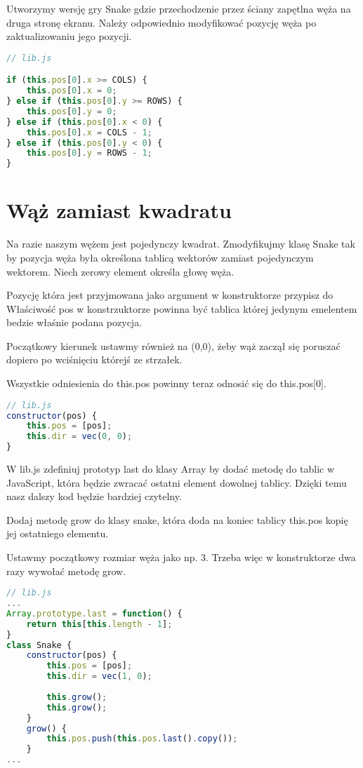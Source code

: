 \documentclass[12pt]{article}
\begin{document}
Utworzymy wersję gry Snake gdzie przechodzenie przez ściany zapętlna węża na druga stronę ekranu. Należy odpowiednio modyfikować pozycję węża po zaktualizowaniu jego pozycji.
\begin{lstlisting}[language=JavaScript]
// lib.js

if (this.pos[0].x >= COLS) {
    this.pos[0].x = 0;
} else if (this.pos[0].y >= ROWS) {
    this.pos[0].y = 0;
} else if (this.pos[0].x < 0) {
    this.pos[0].x = COLS - 1;
} else if (this.pos[0].y < 0) {
    this.pos[0].y = ROWS - 1;
}
\end{lstlisting}


\section{Wąż zamiast kwadratu}

Na razie naszym wężem jest pojedynczy kwadrat. Zmodyfikujmy klasę Snake tak by pozycja węża była określona tablicą wektorów zamiast pojedynczym wektorem. Niech zerowy element określa głowę węża.

Pozycję która jest przyjmowana jako argument w konstruktorze przypisz do 
Właściwość pos w konstrzuktorze powinna być tablica której jedynym emelentem bedzie właśnie podana pozycja.

Początkowy kierunek ustawmy również na (0,0), żeby wąż zaczął się poruszać dopiero po wciśnięciu którejś ze strzałek.

Wszystkie odniesienia do this.pos powinny teraz odnosić się do this.pos[0].

\begin{lstlisting}[language=JavaScript]
// lib.js
constructor(pos) {
    this.pos = [pos];
    this.dir = vec(0, 0);
}
\end{lstlisting}

W lib.js zdefiniuj prototyp last do klasy Array by dodać metodę do tablic w JavaScript, która będzie zwracać ostatni element dowolnej tablicy. Dzięki temu nasz dalszy kod będzie bardziej czytelny.

Dodaj metodę grow do klasy snake, która doda na koniec tablicy this.pos kopię jej ostatniego elementu.

Ustawmy początkowy rozmiar węża jako np. 3. Trzeba więc w konstruktorze dwa razy wywołać metodę grow.

\begin{lstlisting}[language=JavaScript]
// lib.js
...
Array.prototype.last = function() {
    return this[this.length - 1];
}
class Snake {
    constructor(pos) {
        this.pos = [pos];
        this.dir = vec(1, 0);
        
        this.grow();
        this.grow();
    }
    grow() {
        this.pos.push(this.pos.last().copy());
    }
...
\end{lstlisting}
\end{document}
